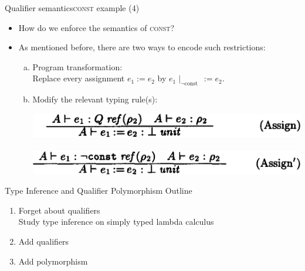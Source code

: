 \documentclass{beamer}
\begin{document}
\begin{frame}{Qualifier semantics}{\textsc{const} example (4)}
  \begin{itemize}
  \item How do we enforce the semantics of \textsc{const}?
  \item<2-> As mentioned before, there are two ways to encode such restrictions:
    \begin{enumerate}[a)]
    \item<2-> Program transformation:\\ Replace every assignment $e_1\!:=\!e_2$ by $e_1\!\mid_{\neg\text{const}}\,:=\!e_2$.
    \item<3-> Modify the relevant typing rule(s):\\
      \begin{center}
      \includegraphics[scale=0.25]{paper_assign_original.png}\\
      \vspace{0.5em}{\Huge $\Downarrow$}\hspace{5.8em}\vspace{0.5em}\\
      \includegraphics[scale=0.25]{paper_assign_adapted.png}
      \end{center}
    \end{enumerate}
  \end{itemize}
\end{frame}



\begin{frame}{Type Inference and Qualifier Polymorphism}
Outline
\begin{enumerate}
\item Forget about qualifiers\\
Study type inference on simply typed lambda calculus
\item Add qualifiers
\item Add polymorphism
\end{enumerate}
\end{frame}
\end{document}
